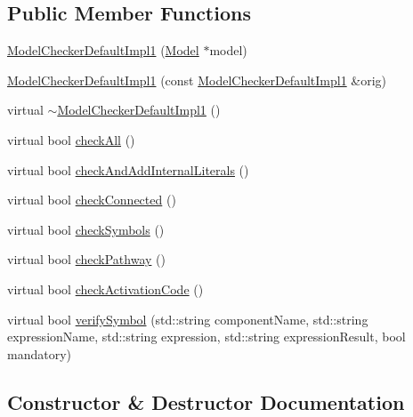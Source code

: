 \subsection*{Public Member Functions}
\begin{DoxyCompactItemize}
\item 
\hyperlink{class_model_checker_default_impl1_aef63d7b52b50ccc532fddbdb3c4eb65f}{Model\+Checker\+Default\+Impl1} (\hyperlink{class_model}{Model} $\ast$model)
\item 
\hyperlink{class_model_checker_default_impl1_aff4913aefb7fe11a786118c210dbd237}{Model\+Checker\+Default\+Impl1} (const \hyperlink{class_model_checker_default_impl1}{Model\+Checker\+Default\+Impl1} \&orig)
\item 
virtual \hyperlink{class_model_checker_default_impl1_a17ba10af801b2c3df62f2fe997c0f643}{$\sim$\+Model\+Checker\+Default\+Impl1} ()
\item 
virtual bool \hyperlink{class_model_checker_default_impl1_a4d092a82540b0f4942c1456dfaebde4f}{check\+All} ()
\item 
virtual bool \hyperlink{class_model_checker_default_impl1_ae51a7c9380af64c790d1c61e37e57202}{check\+And\+Add\+Internal\+Literals} ()
\item 
virtual bool \hyperlink{class_model_checker_default_impl1_a9b694ab8b21481238f584ce70831832a}{check\+Connected} ()
\item 
virtual bool \hyperlink{class_model_checker_default_impl1_a2088315a12f9cc019306427e439541c6}{check\+Symbols} ()
\item 
virtual bool \hyperlink{class_model_checker_default_impl1_ae373809c259c2ef0514898fdc22e9a1f}{check\+Pathway} ()
\item 
virtual bool \hyperlink{class_model_checker_default_impl1_aaeb8dd48555bf1c42d9f1f0dd2e8ae66}{check\+Activation\+Code} ()
\item 
virtual bool \hyperlink{class_model_checker_default_impl1_a9d021151effa2f7ed5ffa1a691eb7668}{verify\+Symbol} (std\+::string component\+Name, std\+::string expression\+Name, std\+::string expression, std\+::string expression\+Result, bool mandatory)
\end{DoxyCompactItemize}


\subsection{Constructor \& Destructor Documentation}
